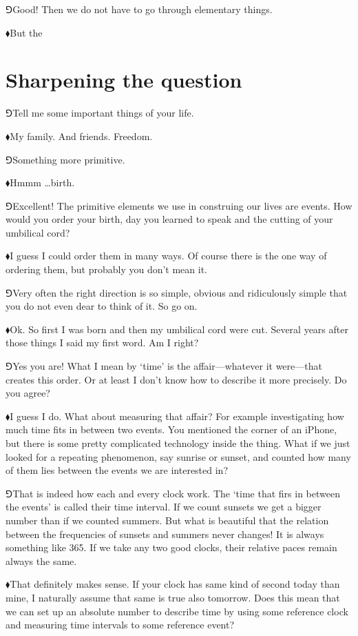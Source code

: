 \documentclass[10pt,oneside%
]{memoir}
\newcommand{\hea}{\(\blacklozenge\)\;}
\newcommand{\heb}{\(\Game\)\;}
\begin{document}
\heb Good! Then we do not have to go through elementary things.

\hea But the 

\section{Sharpening the question}
\heb Tell me some important things of your life.

\hea My family. And friends. Freedom.

\heb Something more primitive.

\hea Hmmm \ldots birth.

\heb Excellent! The primitive elements we use in construing our lives are events. How would you order your birth, day you learned to speak and the cutting of your umbilical cord?

\hea I guess I could order them in many ways. Of course there is the one way of ordering them, but probably you don't mean it.

\heb Very often the right direction is so simple, obvious and ridiculously simple that you do not even dear to think of it. So go on.

\hea Ok. So first I was born and then my umbilical cord were cut. Several years after those things I said my first word. Am I right?

\heb Yes you are! What I mean by `time' is the affair---whatever it were---that creates this order. Or at least I don't know how to describe it more precisely. Do you agree?

\hea I guess I do. What about measuring that affair? For example investigating how much time fits in between two events. You mentioned the corner of an iPhone, but there is some pretty complicated technology inside the thing. What if we just looked for a repeating phenomenon, say sunrise or sunset, and counted how many of them lies between the events we are interested in?

\heb That is indeed how each and every clock work. The `time that firs in between the events' is called their time interval. If we count sunsets we get a bigger number than if we counted summers. But what is beautiful that the relation between the frequencies of sunsets and summers never changes! It is always something like 365. If we take any two good clocks, their relative paces remain always the same.

\hea That definitely makes sense. If your clock has same kind of second today than mine, I naturally assume that same is true also tomorrow. Does this mean that we can set up an absolute number to describe time by using some reference clock and measuring time intervals to some reference event?
\end{document}
